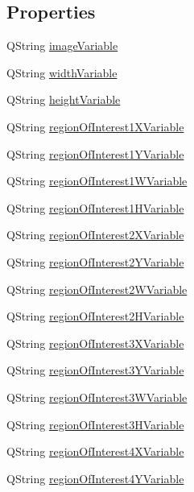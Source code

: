 \subsection*{Properties}
\begin{DoxyCompactItemize}
\item 
QString \hyperlink{classQEImage_a4387f3f14b3384ce8f48400047aa70d1}{imageVariable}
\item 
QString \hyperlink{classQEImage_aafee99d124174f1efe12b779d1a37d63}{widthVariable}
\item 
QString \hyperlink{classQEImage_ac8296f0fa0743fb5284ec70028af7310}{heightVariable}
\item 
QString \hyperlink{classQEImage_a7351e94f008f83761df0c1b128734144}{regionOfInterest1XVariable}
\item 
QString \hyperlink{classQEImage_a886214b38ed03319075648f5dd775012}{regionOfInterest1YVariable}
\item 
QString \hyperlink{classQEImage_ad8bfe4dc608f43046df55a90bad0daf8}{regionOfInterest1WVariable}
\item 
QString \hyperlink{classQEImage_a0918d2df76f4fc169173847db08b9ecf}{regionOfInterest1HVariable}
\item 
QString \hyperlink{classQEImage_ad2fef828e600b515921b62cbd5ade25e}{regionOfInterest2XVariable}
\item 
QString \hyperlink{classQEImage_af3d8ee50db0406313b508105e0d5a5b5}{regionOfInterest2YVariable}
\item 
QString \hyperlink{classQEImage_aa5daa92105cbd176c587edb4c5f6dd48}{regionOfInterest2WVariable}
\item 
QString \hyperlink{classQEImage_a0a1ae6f9b52eebd5c1c8a2849387f933}{regionOfInterest2HVariable}
\item 
QString \hyperlink{classQEImage_a11788466a5a7ebc351afa6b21a488ec2}{regionOfInterest3XVariable}
\item 
QString \hyperlink{classQEImage_a25e653679179fa91eea118513635d91d}{regionOfInterest3YVariable}
\item 
QString \hyperlink{classQEImage_a54b287f53c049ea4408728c4e4f44696}{regionOfInterest3WVariable}
\item 
QString \hyperlink{classQEImage_a1346409293aef0cbd49bfda451e3896d}{regionOfInterest3HVariable}
\item 
QString \hyperlink{classQEImage_a9d5b3ec22cd90b502473c9d58f12229d}{regionOfInterest4XVariable}
\item 
QString \hyperlink{classQEImage_aeef143dd5978a2a973e285d12d8c3367}{regionOfInterest4YVariable}

\end{DoxyCompactItemize}
